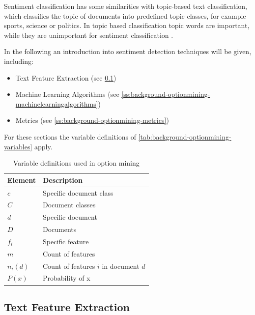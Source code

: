 Sentiment classification has some similarities with topic-based text classification, which classifies the topic of documents into predefined topic classes, for example sports, science or politics.
In topic based classification topic words are important, while they are unimportant for sentiment classification \cite[page 412f]{Liu2007}.

In the following an introduction into sentiment detection techniques will be given, including:

\begin{itemize}
    \item Text Feature Extraction (see \cref{ss:background-optionmining-textfeatureextraction})
    \item Machine Learning Algorithms (see \cref{ss:background-optionmining-machinelearningalgorithms})
    \item Metrics (see \cref{ss:background-optionmining-metrics})
\end{itemize}

For these sections the variable definitions of \autoref{tab:background-optionmining-variables} apply.

\begin{table}
	\begin{center}
		\begin{tabular}{l l}
			\textbf{Element} & \textbf{Description} \\ \hline
			$c$ & Specific document class \\
			$C$ & Document classes \\
			$d$ & Specific document \\
			$D$ & Documents \\
			$f_i$ & Specific feature \\
			$m$ & Count of features \\
			$n_i(d)$ & Count of features $i$ in document $d$ \\
			$P(x)$ & Probability of x \\
		\end{tabular}

        \caption{Variable definitions used in option mining}
        \label{tab:background-optionmining-variables}
	\end{center}
\end{table}

\subsection{Text Feature Extraction}
\label{ss:background-optionmining-textfeatureextraction}

